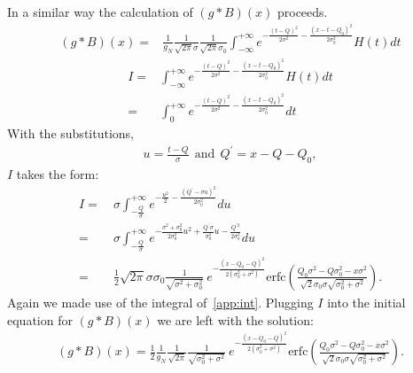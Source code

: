 \documentclass[preprint,12pt]{elsarticle}
\begin{document}
In a similar way the calculation of  $(g*B)(x)$ proceeds. 
\begin{align}
(g*B)(x) = & \frac{1 }{g_N}  \frac{1 }{\sqrt{2\pi}\sigma} \frac{1 }{\sqrt{2\pi}\sigma_0} \int^{+\infty}_{ -\infty  }  e^{-\frac{(t-Q)^2}{2\sigma^2} - \frac{(x-t-Q_0)^2}{2\sigma_0^2}} H(t) dt
\end{align}
\begin{align}
I = & \int^{+\infty}_{ -\infty  }  e^{-\frac{(t-Q)^2}{2\sigma^2} - \frac{(x-t-Q_0)^2}{2\sigma_0^2}} H(t) dt \nonumber \\
  = & \int^{+\infty}_{ 0  }  e^{-\frac{(t-Q)^2}{2\sigma^2} - \frac{(x-t-Q_0)^2}{2\sigma_0^2}} dt
\end{align}
With the substitutions,
\begin{align}
u = \frac{t-Q}{\sigma} \ \  \text{and}\  \ Q^\prime = x - Q - Q_0,
\end{align}
$I$ takes the form:
\begin{align}
I = \ & \sigma \int^{+\infty}_{ -\frac{Q}{\sigma}  }  e^{-\frac{u^2}{2} - \frac{(Q^\prime-\sigma u )^2}{2\sigma_0^2}} du \nonumber \\
  = \ & \sigma \int^{+\infty}_{ -\frac{Q}{\sigma}  } e^{-\frac{\sigma^2+\sigma_0^2}{2\sigma_0^2 }u^2 + \frac{Q^\prime\sigma}{\sigma_0^2}u - \frac{Q^{\prime 2}}{2\sigma_0^2}  } du \nonumber \\
  = \ &  \frac{1}{2} \sqrt{2\pi} \sigma \sigma_0 \frac{1}{\sqrt{\sigma^2 +\sigma_0^2}} \ e^{ -\frac{(x-Q_0-Q)^2}{2( \sigma_0^2 + \sigma^2 )}} 
  \text{erfc} 
  \left(    \frac{ Q_0\sigma^2 -Q\sigma_0^2 -x \sigma^2  }{\sqrt{2} \sigma_0\sigma\sqrt{\sigma_0^2 + \sigma^2} }         \right). 
\end{align}
Again we made use of the integral of~\ref{app:int}. 
Plugging $I$ into the initial equation for $(g*B)(x)$ we are left with the solution: 
\begin{align}
(g*B)(x) = \frac{1}{2} \frac{1}{g_N}  \frac{1}{\sqrt{2\pi}} \frac{1}{\sqrt{\sigma_0^2 +\sigma^2}}  \ e^{ -\frac{(x-Q_0-Q)^2}{2( \sigma_0^2 + \sigma^2 )}} 
\text{erfc} 
  \left(    \frac{ Q_0\sigma^2 -Q\sigma_0^2 -x \sigma^2  }{\sqrt{2} \sigma_0\sigma\sqrt{\sigma_0^2 + \sigma^2} }         \right). 
\end{align}
\end{document}
